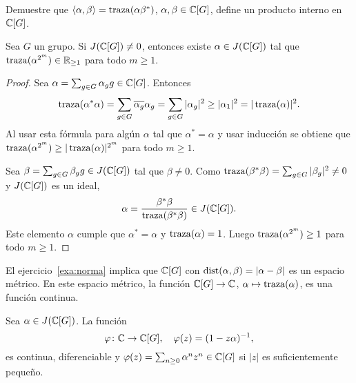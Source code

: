 \begin{exercise}
\begin{exercise}
	Demuestre que 
	$\langle\alpha,\beta\rangle=\operatorname{traza}(\alpha\beta^*)$, $\alpha,\beta\in\mathbb{C}[G]$, 
	define un producto interno en $\mathbb{C}[G]$.
\end{exercise}

\begin{lemma}
	\label{lem:algebraico}
	Sea $G$ un grupo. Si $J(\mathbb{C}[G])\ne 0$, entonces existe $\alpha\in J(\mathbb{C}[G])$ tal que 
	$\operatorname{traza}(\alpha^{2^m})\in\mathbb{R}_{\geq1}$ 
	para todo $m\geq1$.
\end{lemma}

\begin{proof}
	Sea $\alpha=\sum_{g\in G}\alpha_gg\in\mathbb{C}[G]$. Entonces	
	\[
		\operatorname{traza}(\alpha^*\alpha)
		=\sum_{g\in G}\overline{\alpha_g}\alpha_g
		=\sum_{g\in G}|\alpha_g|^2\geq|\alpha_1|^2
		=|\operatorname{traza}(\alpha)|^2.
	\]
	Al usar esta fórmula para algún $\alpha$ tal que $\alpha^*=\alpha$ y usar
	inducción se obtiene que $\operatorname{traza}(\alpha^{2^m})\geq|\operatorname{traza}(\alpha)|^{2^m}$
	para todo $m\geq1$. 

	Sea $\beta=\sum_{g\in G}\beta_gg\in J(\mathbb{C}[G])$ tal que $\beta\ne0$. Como
	$\operatorname{traza}(\beta^*\beta)=\sum_{g\in G}|\beta_g|^2\ne0$ y $J(\mathbb{C}[G])$ es un ideal, 
	\[
		\alpha=\frac{\beta^*\beta}{\operatorname{traza}(\beta^*\beta)}\in J(\mathbb{C}[G]).
	\]
	Este elemento $\alpha$ cumple que $\alpha^*=\alpha$ y $\operatorname{traza}(\alpha)=1$.
	Luego $\operatorname{traza}(\alpha^{2^m})\geq 1$ para todo $m\geq1$.
\end{proof}

El ejercicio~\ref{exa:norma} implica que $\mathbb{C}[G]$ con
$\mathrm{dist}(\alpha,\beta)=|\alpha-\beta|$ es un espacio métrico. En este espacio
métrico, la función $\mathbb{C}[G]\to\mathbb{C}$, $\alpha\mapsto \operatorname{traza}(\alpha)$, es una
función continua.

\begin{lemma}
	\label{lem:phi_diferenciable}
	Sea $\alpha\in J(\mathbb{C}[G])$. La función
	\[
		\varphi\colon\mathbb{C}\to\mathbb{C}[G],\quad
		\varphi(z)=(1-z\alpha)^{-1},
	\]
	es continua, diferenciable y $\varphi(z)=\sum_{n\geq0}\alpha^nz^n\in\mathbb{C}[G]$ si $|z|$
	es suficientemente pequeño.
\end{lemma}


\end{exercise}
